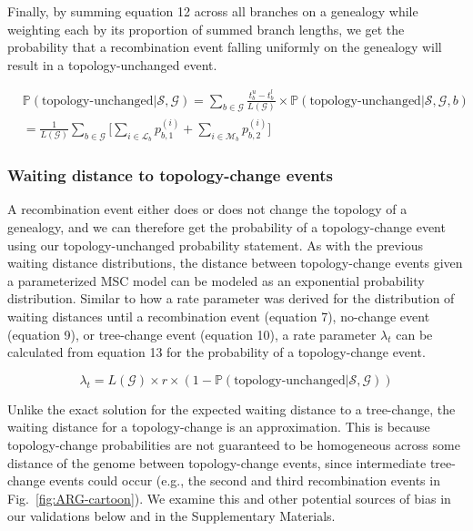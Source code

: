 \documentclass[11pt]{article}
\begin{document}
\noindent Finally, by summing equation 12 across all branches on a 
genealogy while weighting each by its proportion of summed branch lengths,
we get the probability that a recombination event falling 
uniformly on the genealogy will result in a topology-unchanged event.

\begin{equation}
\begin{aligned}
	&\mathbb{P}(\textrm{topology-unchanged} | \mathcal{S},\mathcal{G})
	= \sum_{b \in \mathcal{G}}\frac{t_b^u - t_b^l}{L(\mathcal{G})} 
	\times 
	\mathbb{P}(\textrm{topology-unchanged} | \mathcal{S},\mathcal{G},b)
	\\
	&
	= \frac{1}{L(\mathcal{G})} \sum_{b \in \mathcal{G}}
	\bigg[ 
		\sum_{i \in \mathcal{L}_b} p_{b,1}^{(i)} +
		\sum_{i \in \mathcal{M}_b} p_{b,2}^{(i)}
	\bigg]
\end{aligned}
\end{equation}

\subsubsection{Waiting distance to topology-change events}
A recombination event either does or does not change the topology
of a genealogy, and we can therefore get the probability of a 
topology-change event using our topology-unchanged probability statement.
As with the previous waiting distance distributions, the distance between
topology-change events given a parameterized MSC model can be 
modeled as an exponential probability distribution. 
Similar to how a rate parameter was derived for the distribution 
of waiting distances until a recombination event (equation 7), 
no-change event (equation 9), or tree-change event (equation 10), 
a rate parameter $\lambda_t$ can be calculated from equation 13 for 
the probability of a topology-change event. 

\begin{equation}
	\lambda_{t} = 
	L(\mathcal{G}) \times r \times 
	(1 - \mathbb{P}(\text{topology-unchanged} | \mathcal{S},\mathcal{G}))
\end{equation}


Unlike the exact solution for the expected waiting distance to a  
tree-change, the waiting distance for a topology-change is an
approximation. This is because topology-change probabilities are not 
guaranteed to be homogeneous across some distance of the genome between 
topology-change events, since intermediate tree-change events could occur
(e.g., the second and third recombination events in Fig.~\ref{fig:ARG-cartoon}).
We examine this and other potential sources of bias in our validations
below and in the Supplementary Materials.
\end{document}

